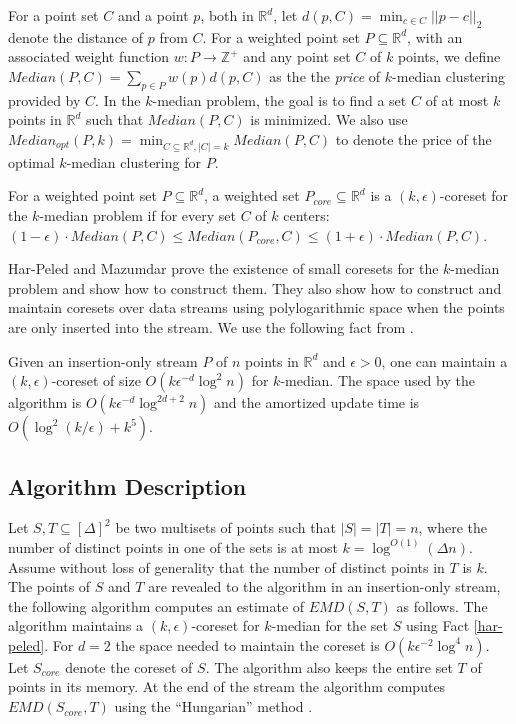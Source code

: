 \documentclass[oribibl]{llncs}
\begin{document}
For a point set $C$ and a point $p$, both in $\mathbb{R}^d$,
let $d(p,C)= \min_{c\in C}||p-c||_2$ denote the distance of $p$
from $C$.
For a weighted point set $P\subseteq\mathbb{R}^d$, with
an associated weight function $w: P\rightarrow\mathbb{Z}^+$
and any point set $C$ of $k$ points, we define
$Median(P,C) = \sum_{p\in P}w(p)d(p,C)$ as the the \textit{price} of
$k$-median clustering provided by $C$. In the $k$-median
problem, the goal is to find a set $C$ of at most $k$ points
in $\mathbb{R}^d$ such that $Median(P,C)$ is minimized.
We also use $Median_{opt}(P,k) = \min_{C\subseteq\mathbb{R}^d, |C|=k}Median(P,C)$
to denote the price of the optimal $k$-median clustering for $P$.

\begin{definition}[Coreset]
For a weighted point set $P\subseteq\mathbb{R}^d$, a weighted set
$P_{core}\subseteq\mathbb{R}^d$ is a $(k,\epsilon)$-coreset for the
$k$-median problem if for every set $C$ of $k$ centers:
$(1-\epsilon)\cdot Median(P,C)\le Median(P_{core},C)
\le (1+\epsilon)\cdot Median(P,C)$. 
\end{definition}

Har-Peled and Mazumdar \cite{kcoreset} prove the existence of small
coresets for the $k$-median problem and show how to construct them.
They also show how to construct and maintain coresets over data streams
using polylogarithmic space when the points are only inserted into the
stream. We use the following fact from \cite{kcoreset}.

\begin{fact}\label{har-peled}
 Given an insertion-only stream $P$ of $n$ points in $\mathbb{R}^d$ and
$\epsilon>0$, one can maintain a
$(k,\epsilon)$-coreset of size $O(k\epsilon^{-d}\log^2 n)$ for $k$-median.
The space used by the algorithm is $O(k\epsilon^{-d}\log^{2d+2} n)$ and the
amortized update time is $O(\log^2(k/\epsilon) + k^5)$.
\end{fact}

\subsection{Algorithm Description}
Let $S, T\subseteq [\Delta]^2$ be two multisets of points such that $|S|=|T|=n$,
where the number of distinct points in one of the sets is at most
$k = \log^{O(1)}(\Delta n)$. Assume without loss of generality that the
number of distinct points in $T$ is $k$.
The points of $S$ and $T$ are revealed to the algorithm in an insertion-only
stream, the following algorithm computes an estimate of $EMD(S,T)$ as follows.
The algorithm maintains a $(k,\epsilon)$-coreset for $k$-median
for the set $S$ using Fact \ref{har-peled}. For $d=2$ the space needed to
maintain the coreset is $O(k\epsilon^{-2}\log^{4}n)$. Let $S_{core}$ denote
the coreset of $S$. The algorithm also
keeps the entire set $T$ of points in its memory. At the end of
the stream the algorithm computes $EMD(S_{core}, T)$ using the
``Hungarian'' method \cite{lawler}.
\end{document}
